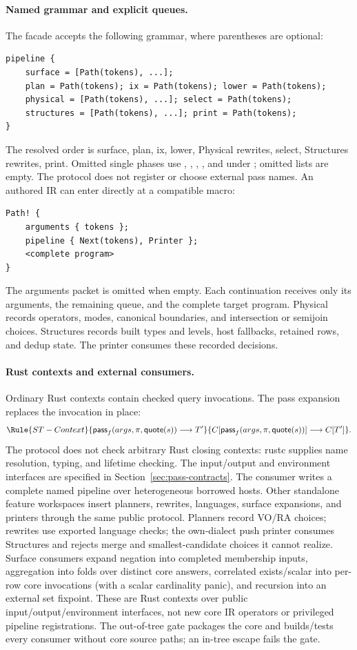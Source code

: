 \paragraph{Named grammar and explicit queues.}
The facade accepts the following grammar, where parentheses are optional:
\begin{lstlisting}
pipeline {
    surface = [Path(tokens), ...];
    plan = Path(tokens); ix = Path(tokens); lower = Path(tokens);
    physical = [Path(tokens), ...]; select = Path(tokens);
    structures = [Path(tokens), ...]; print = Path(tokens);
}
\end{lstlisting}
The resolved order is surface, plan, ix, lower, Physical rewrites, select,
Structures rewrites, print. Omitted single phases use
, , , , and
 under ;
omitted lists are empty. The protocol does not register or choose external
pass names. An authored IR can enter directly at a compatible macro:
\begin{lstlisting}
Path! {
    arguments { tokens };
    pipeline { Next(tokens), Printer };
    <complete program>
}
\end{lstlisting}
The arguments packet is omitted when empty. Each continuation receives only
its arguments, the remaining queue, and the complete target program.
Physical records operators, modes, canonical boundaries, and intersection or
semijoin choices. Structures records built types and levels, host fallbacks,
retained rows, and dedup state. The printer consumes these recorded decisions.

\paragraph{Rust contexts and external consumers.}
Ordinary Rust contexts contain checked query invocations. The pass expansion
replaces the invocation in place:
\[
\Rule{ST-Context}{\mathsf{pass}_f(args,\pi,\mathsf{quote}(s))\longrightarrow T'}
 {C[\mathsf{pass}_f(args,\pi,\mathsf{quote}(s))]\longrightarrow C[T']}.
\]
The protocol does not check arbitrary Rust closing contexts: rustc supplies
name resolution, typing, and lifetime checking. The input/output and
environment interfaces are specified in Section~\ref{sec:pass-contracts}.
The  consumer writes a complete named pipeline over
heterogeneous borrowed hosts. Other standalone feature workspaces insert
planners, rewrites, languages, surface expansions, and printers through the
same public protocol. Planners record VO/RA choices; rewrites use exported
language checks; the own-dialect push printer consumes Structures and rejects
merge and smallest-candidate choices it cannot realize. Surface consumers
expand negation into completed membership inputs, aggregation into folds over
distinct core answers, correlated exists/scalar into per-row core invocations
(with a scalar cardinality panic), and recursion into an external set fixpoint.
These are Rust contexts over public input/output/environment interfaces,
not new core IR operators or privileged pipeline registrations.
The out-of-tree gate packages the core and builds/tests
every consumer without core source paths; an in-tree escape fails the gate.

